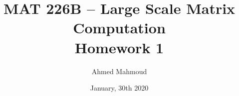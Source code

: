 \documentclass[12pt] {article}
\begin{document}
\title{MAT 226B – Large Scale Matrix Computation \\ Homework 1}
\author{Ahmed Mahmoud}
\date{January, 30th 2020} 

\maketitle




\end{document}
